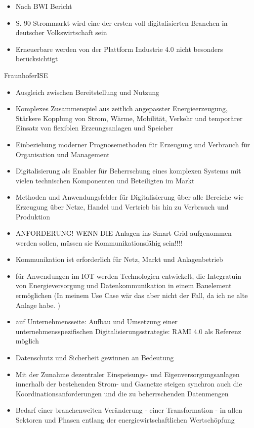\begin{itemize}
  \item Nach BWI Bericht
  \item S. 90 Strommarkt wird eine der ersten voll digitalisierten Branchen in deutscher Volkswirtschaft sein
  \item Erneuerbare werden von der Plattform Industrie 4.0 nicht besonders berücksichtigt
\end{itemize}

FraunhoferISE

\begin{itemize}
  \item Ausgleich zwischen Bereitstellung und Nutzung
  \item Komplexes Zusammenspiel aus zeitlich angepasster Energieerzeugung, Stärkere Kopplung von Strom, Wärme, Mobilität, Verkehr und temporärer Einsatz von flexiblen Erzeungsanlagen  und Speicher
  \item Einbeziehung moderner Prognosemethoden für Erzeugung und Verbrauch für Organisation und Management
  \item Digitalisierung als Enabler für Beherrschung eines komplexen Systems mit vielen technischen Komponenten und Beteiligten im Markt
  \item Methoden und Anwendungsfelder für Digitalisierung über alle Bereiche wie Erzeugung über Netze, Handel und Vertrieb bis hin zu Verbrauch und Produktion
  \item ANFORDERUNG! WENN DIE Anlagen ins Smart Grid aufgenommen werden sollen, müssen sie Kommunikationsfähig sein!!!!
  \item Kommunikation ist erforderlich für Netz, Markt und Anlagenbetrieb
  \item für Anwendungen im IOT werden Technologien entwickelt, die Integratuin von Energieversorgung und Datenkommunikation in einem Bauelement ermöglichen (In meinem Use Case wär das aber nicht der Fall, da ich ne alte Anlage habe. )
\end{itemize}



\begin{itemize}

  \item auf Unternehmensseite: Aufbau und Umsetzung einer unternehmensspezifischen Digitalisierungsstrategie: RAMI 4.0 als Referenz möglich
   \item Datenschutz und Sicherheit gewinnen an Bedeutung
  \item \glqq Mit der Zunahme dezentraler Einspeisungs- und Eigenversorgungsanlagen innerhalb der bestehenden Strom- und Gasnetze steigen synchron auch die Koordinationsanforderungen und die zu beherrschenden Datenmengen \grqq{} \citep[S. 7]{Doleski2016}
  \item \glqq Bedarf einer branchenweiten Veränderung - einer Transformation - in allen Sektoren und Phasen entlang der energiewirtschaftlichen Wertschöpfung\grqq{} \cite[S. 11]{Doleski2016}
\end{itemize}


